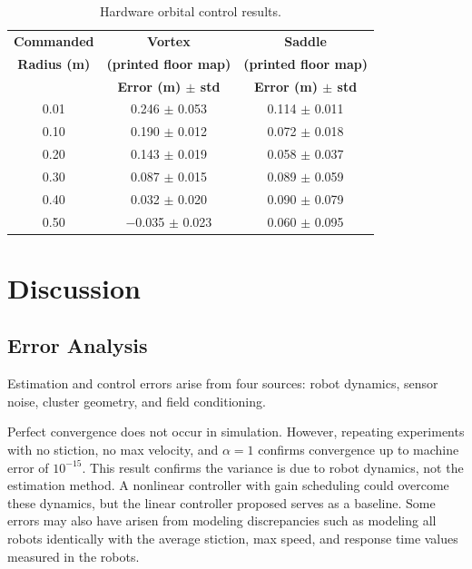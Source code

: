 \documentclass[lettersize,journal]{IEEEtran}
\begin{document}
\begin{table}[!t]
    \centering
    \caption{Hardware orbital control results.}
    \label{tab:orbital_radius_comparison}
    \begin{tabular}{ccc}
    \hline
    \textbf{Commanded} & \textbf{Vortex} & \textbf{Saddle} \\
    \textbf{Radius (m)} & \textbf{(printed floor map)} & \textbf{(printed floor map)} \\
     & \textbf{Error (m) $\pm$ std} & \textbf{Error (m) $\pm$ std} \\
    \hline
    0.01 & 0.246 $\pm$ 0.053 & 0.114 $\pm$ 0.011 \\
    0.10 & 0.190 $\pm$ 0.012 & 0.072 $\pm$ 0.018 \\
    0.20 & 0.143 $\pm$ 0.019 & 0.058 $\pm$ 0.037 \\
    0.30 & 0.087 $\pm$ 0.015 & 0.089 $\pm$ 0.059 \\
    0.40 & 0.032 $\pm$ 0.020 & 0.090 $\pm$ 0.079 \\
    0.50 & $-$0.035 $\pm$ 0.023 & 0.060 $\pm$ 0.095 \\
    \hline
    \end{tabular}
    \end{table}


\section{Discussion}

\subsection{Error Analysis}

Estimation and control errors arise from four sources: robot dynamics, sensor noise, cluster geometry, and field conditioning.

Perfect convergence does not occur in simulation. However, repeating experiments with no stiction, no max velocity, and $\alpha = 1$ confirms convergence up to machine error of $10^{-15}$. This result confirms the variance is due to robot dynamics, not the estimation method. A nonlinear controller with gain scheduling could overcome these dynamics, but the linear controller proposed serves as a baseline. Some errors may also have arisen from modeling discrepancies such as modeling all robots identically with the average stiction, max speed, and response time values measured in the robots.
\end{document}
